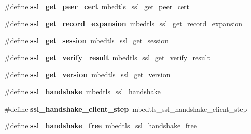 \begin{DoxyCompactItemize}
\mbox{\label{compat-1_83_8h_a50479818ce5730ec54c056a82c00ecbf}} 
\#define {\bfseries ssl\+\_\+get\+\_\+peer\+\_\+cert}~\mbox{\hyperlink{ssl_8h_aa7ab0ac8d8341063a0f815ee99337831}{mbedtls\+\_\+ssl\+\_\+get\+\_\+peer\+\_\+cert}}
\item 
\mbox{\label{compat-1_83_8h_a66b2bbe8af1bb0163c1bd4a3a28102cc}} 
\#define {\bfseries ssl\+\_\+get\+\_\+record\+\_\+expansion}~\mbox{\hyperlink{ssl_8h_a935f3ebfb31f988e24a8bf9bcb0fd26b}{mbedtls\+\_\+ssl\+\_\+get\+\_\+record\+\_\+expansion}}
\item 
\mbox{\label{compat-1_83_8h_aca3ff78e38738b7d4b66ae18d2b0925d}} 
\#define {\bfseries ssl\+\_\+get\+\_\+session}~\mbox{\hyperlink{ssl_8h_ad617a178adfaf259db89c4fe092ad6e1}{mbedtls\+\_\+ssl\+\_\+get\+\_\+session}}
\item 
\mbox{\label{compat-1_83_8h_a3e280cfb190f6bb63189589ee99c4ea5}} 
\#define {\bfseries ssl\+\_\+get\+\_\+verify\+\_\+result}~\mbox{\hyperlink{ssl_8h_a516064f1468d459159ef7cd6c496a026}{mbedtls\+\_\+ssl\+\_\+get\+\_\+verify\+\_\+result}}
\item 
\mbox{\label{compat-1_83_8h_a12bd469fdb2bc9364ea66afc3c5ca39a}} 
\#define {\bfseries ssl\+\_\+get\+\_\+version}~\mbox{\hyperlink{ssl_8h_a1ee2e52fe2ae9620af84df97a0347ce3}{mbedtls\+\_\+ssl\+\_\+get\+\_\+version}}
\item 
\mbox{\label{compat-1_83_8h_a06d9483f9ebf6729e238de23a9472beb}} 
\#define {\bfseries ssl\+\_\+handshake}~\mbox{\hyperlink{ssl_8h_a4a37e497cd08c896870a42b1b618186e}{mbedtls\+\_\+ssl\+\_\+handshake}}
\item 
\mbox{\label{compat-1_83_8h_a6772a29969331d9c91c49ed9e8d994bf}} 
\#define {\bfseries ssl\+\_\+handshake\+\_\+client\+\_\+step}~mbedtls\+\_\+ssl\+\_\+handshake\+\_\+client\+\_\+step
\item 
\mbox{\label{compat-1_83_8h_a1ad21481fc277bd6e9a4fa7bda1be04e}} 
\#define {\bfseries ssl\+\_\+handshake\+\_\+free}~mbedtls\+\_\+ssl\+\_\+handshake\+\_\+free
\item 
\mbox{\label{compat-1_83_8h_a1f12209e56f43b407e99753fe4a50d7e}} 

\end{DoxyCompactItemize}
